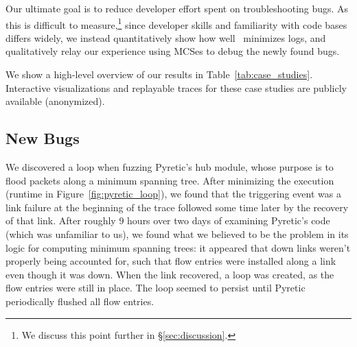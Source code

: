 Our ultimate goal is to reduce developer effort spent on troubleshooting bugs.
As this is difficult to measure,\footnote{We discuss this point further in
\S\ref{sec:discussion}.} since developer skills and
familiarity with code bases differs widely, we instead
quantitatively show how well \projectname~minimizes logs,
and qualitatively relay our experience using MCSes to debug the newly found bugs.


We show a high-level overview
of our results in Table~\ref{tab:case_studies}. Interactive visualizations and replayable traces
for these case studies are publicly available (anonymized).

\subsection{New Bugs}

 We discovered a loop when fuzzing Pyretic's hub
module, whose purpose is to flood packets along a minimum spanning tree. After
minimizing the execution (runtime in Figure~\ref{fig:pyretic_loop}), we found that the triggering event
was a link failure at the beginning of the trace followed some time later by
the recovery of that link. After roughly 9 hours over two days of examining
Pyretic's code (which was unfamiliar to us), we found what we believed to be the problem
in its logic for computing minimum spanning trees: it appeared that down links
weren't properly being accounted for, such that flow entries were installed
along a link even though it was down. When the link recovered, a loop was
created, as the flow entries were still in place. The loop seemed to persist until
Pyretic periodically flushed all flow entries.


